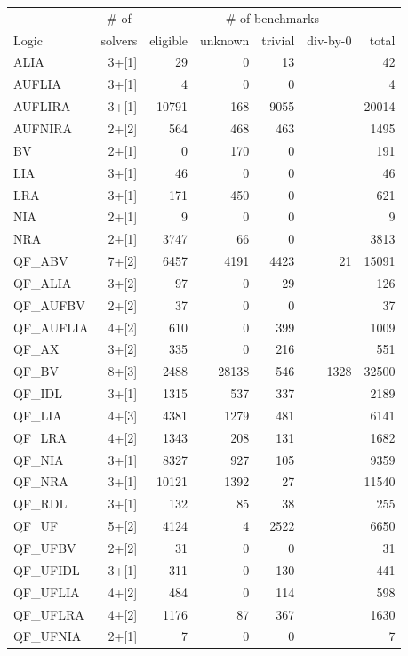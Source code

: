\documentclass[twoside,11pt]{article}
\begin{document}
\begin{table}
\centering
\begin{tabular}{|l|r|r|r|r|r|r|}
\hline
       & \multicolumn{1}{|c|}{\# of} & \multicolumn{5}{|c|}{\# of benchmarks} \\
 Logic & solvers & eligible & unknown  & trivial & div-by-0 & total  \\
\hline
ALIA & 3+[1] & 29 & 0 & 13 &  & 42 \\
AUFLIA & 3+[1] & 4 & 0 & 0 & & 4\\
AUFLIRA & 3+[1] & 10791 & 168 & 9055 & & 20014 \\
AUFNIRA & 2+[2] & 564 & 468 & 463 & & 1495 \\
BV & 2+[1] & 0 & 170 & 0 &  & 191 \\
LIA & 3+[1] & 46 & 0 & 0 & & 46 \\
LRA & 3+[1] & 171 & 450 & 0 & & 621\\
NIA & 2+[1] & 9 & 0 & 0 & & 9\\
NRA & 2+[1] & 3747 & 66 & 0 & & 3813 \\
QF\_ABV & 7+[2] & 6457 & 4191 & 4423 & 21 & 15091 \\
QF\_ALIA & 3+[2] & 97 & 0 & 29 & & 126 \\
QF\_AUFBV & 2+[2] & 37 & 0 & 0 & & 37 \\
QF\_AUFLIA & 4+[2] & 610 & 0 & 399 & & 1009\\
QF\_AX & 3+[2] & 335 & 0 & 216 & & 551 \\
QF\_BV & 8+[3] & 2488 & 28138 & 546 & 1328 & 32500 \\
QF\_IDL & 3+[1] & 1315 & 537 & 337 & & 2189 \\
QF\_LIA & 4+[3] & 4381 & 1279 & 481 & & 6141 \\
QF\_LRA & 4+[2] & 1343 & 208 & 131 & & 1682\\ 
QF\_NIA & 3+[1] & 8327 & 927 & 105 & & 9359 \\
QF\_NRA & 3+[1] & 10121 & 1392 & 27 & & 11540 \\
QF\_RDL & 3+[1] & 132 & 85 & 38 & & 255 \\
QF\_UF & 5+[2] & 4124 & 4 & 2522 & & 6650 \\
QF\_UFBV & 2+[2] & 31 & 0 & 0 & & 31 \\
QF\_UFIDL & 3+[1] & 311 & 0 & 130 & & 441\\
QF\_UFLIA & 4+[2] & 484 & 0 & 114 & & 598 \\
QF\_UFLRA & 4+[2] & 1176 & 87 & 367 & & 1630 \\
QF\_UFNIA & 2+[1] & 7 & 0 &0 & & 7 \\

\end{tabular}
\end{table}
\end{document}
